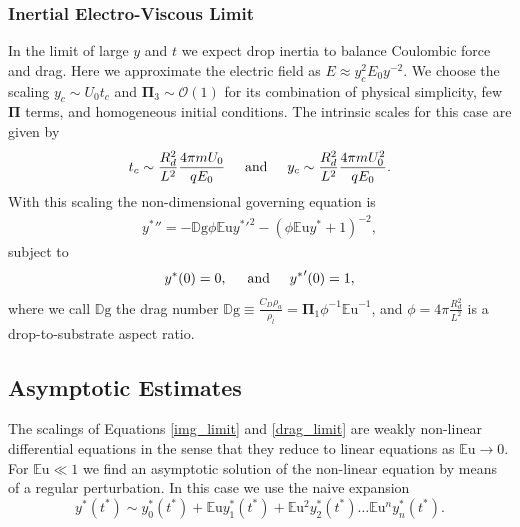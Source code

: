 \documentclass[aip,reprint, floatfix]{revtex4-1}
\begin{document}
\subsubsection{Inertial Electro-Viscous Limit}
In the limit of large $y$ and $t$ we expect drop inertia to balance Coulombic force and drag. Here we approximate the electric field as $E \approx y_c^2 E_0 y^{-2}$. We choose the scaling $y_c \sim U_0 t_c$ and $\mathbf{\Pi}_3 \sim \mathcal{O}(1)$ for its combination of physical simplicity, few $\mathbf{\Pi}$ terms, and homogeneous initial conditions. The intrinsic scales for this case are given by
\[ t_c \sim \frac{R_d^2}{L^2} \frac{4 \pi m U_0}{q E_0} \hspace{5mm} \mbox{and} \hspace{5 mm} y_c \sim \frac{R_d^2}{L^2} \frac{4 \pi m U_0^2}{q E_0}.
\]
With this scaling the non-dimensional governing equation is 
\begin{eqnarray}
&{y^*}'' = - \mathbb{D}\mbox{g} \phi \mathbb{E}\mbox{u} {y^*}'^2 - \left( \phi \mathbb{E}\mbox{u} {y^*} + 1 \right)^{-2}, & \label{drag_limit}
\end{eqnarray}
subject to 
\begin{equation*}
{y^*}(0) = 0, \hspace{5 mm} \mbox{and} \hspace{5 mm} {y^*}'(0) = 1, 
\end{equation*}
where we call $\mathbb{D}\mbox{g}$ the drag number $\mathbb{D}\mbox{g} \equiv \frac{C_D \rho_a}{\rho_l} = \mathbf{\Pi}_1 \phi^{-1}{\mathbb{E}\mbox{u}}^{-1}$, and $\phi = 4 \pi \frac{R_d^2}{L^2}$ is a drop-to-substrate aspect ratio.

\subsection{Asymptotic Estimates}
The scalings of Equations \ref{img_limit} and \ref{drag_limit} are weakly non-linear differential equations in the sense that they reduce to linear equations as $\mathbb{E}\mbox{u} \rightarrow 0$. For $\mathbb{E}\mbox{u} \ll 1$ we find an asymptotic solution of the non-linear equation by means of a regular perturbation. In this case we use the naive expansion
\begin{equation}
{y^*}({t^*}) \sim y^*_0({t^*}) + \mathbb{E}\mbox{u} y^*_1({t^*}) + \mathbb{E}\mbox{u}^2 y^*_2({t^*}) \ldots \mathbb{E}\mbox{u}^n y^*_n ({t^*})  . \label{regular_pert}
\end{equation}
\end{document}
